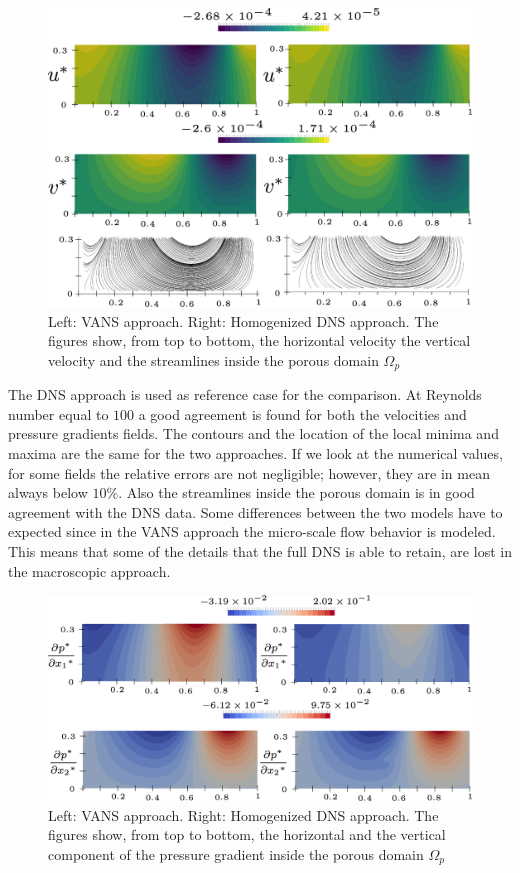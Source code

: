 \begin{figure}[b!]
	\centering
	\includegraphics[width=1\linewidth]{chapter_5/figure/re100/vans_u}
	\caption{Left: VANS approach. Right: Homogenized DNS approach. The figures show, from top to bottom, the horizontal velocity the vertical velocity and the streamlines inside the porous domain $\Omega_p$}
	\label{fig:100_u}
\end{figure}

The DNS approach is used as reference case for the comparison. At Reynolds number equal to $100$ a good agreement is found for both the velocities and pressure gradients fields. The contours and the location of the local minima and maxima are the same for the two approaches. If we look at the numerical values, for some fields the relative errors are not negligible; however, they are in mean always below $10\%$. Also the streamlines inside the porous domain is in good agreement with the DNS data.
Some differences between the two models have to expected since in the VANS approach the micro-scale flow behavior is modeled. This means that some of the details that the full DNS is able to retain, are lost in the macroscopic approach. 

\begin{figure}[t!]
	\centering
	\includegraphics[width=1\linewidth]{chapter_5/figure/re100/vans_p}
	\caption{Left: VANS approach. Right: Homogenized DNS approach. The figures show, from top to bottom, the horizontal and the vertical component of the pressure gradient inside the porous domain $\Omega_p$}
	\label{fig:100_p}
\end{figure}


